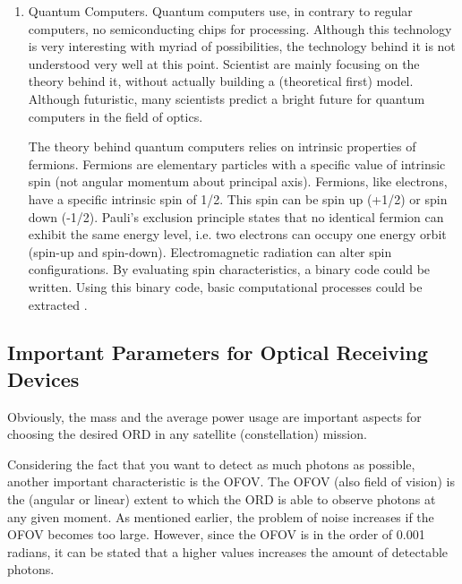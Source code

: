 \begin{enumerate}[i]
\item Quantum Computers. Quantum computers use, in contrary to regular computers, no semiconducting chips for processing. Although this technology is very interesting with myriad of possibilities, the technology behind it is not understood very well at this point. Scientist are mainly focusing on the theory behind it, without actually building a (theoretical first) model. Although futuristic, many scientists predict a bright future for quantum computers in the field of optics.

The theory behind quantum computers relies on intrinsic properties of fermions. Fermions are elementary particles with a specific value of intrinsic spin (not angular momentum about principal axis). Fermions, like electrons, have a specific intrinsic spin of 1/2. This spin can be spin up (+1/2) or spin down (-1/2). Pauli's exclusion principle states that no identical fermion can exhibit the same energy level, i.e. two electrons can occupy one energy orbit (spin-up and spin-down). Electromagnetic radiation can alter spin configurations. By evaluating spin characteristics, a binary code could be written. Using this binary code, basic computational processes could be extracted \cite{quantumcomputers}.

	
\end{enumerate}

\subsection{Important Parameters for Optical Receiving Devices}
	\label{blDOparametersORD}
Obviously, the mass and the average power usage are important aspects for choosing the desired \acs{ORD} in any satellite (constellation) mission. 

Considering the fact that you want to detect as much photons as possible, another important characteristic is the \ac{OFOV}. The \acs{OFOV} (also field of vision) is the (angular or linear) extent to which the \acs{ORD} is able to observe photons at any given moment. As mentioned earlier, the problem of noise increases if the \acs{OFOV} becomes too large. However, since the \acs{OFOV} is in the order of 0.001 radians, it can be stated that a higher values increases the amount of detectable photons.

